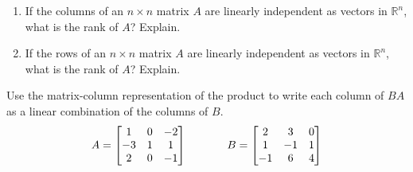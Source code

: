 \documentclass[12pt,letterpaper]{hmcpset}
\begin{document}
\begin{solution}
\vfill
\end{solution}
\newpage

\begin{problem}[2.3.42]

\begin{enumerate}
	\item
		If the columns of an $n \times n$ matrix $A$ are linearly independent as vectors in $\mathbb{R}^n$, what is the rank of $A$? Explain.
	\item
		If the rows of an $n \times n$ matrix $A$ are linearly independent as vectors in $\mathbb{R}^n$, what is the rank of $A$? Explain.
\end{enumerate}

\end{problem}

\begin{solution}
\vfill
\end{solution}
\newpage

\begin{problem}[3.1.26]

Use the matrix-column representation of the product to write each column of $BA$ as a linear combination of the columns of $B$.\\

$$A = \begin{bmatrix}
        1 & 0 & -2 \\
        -3 & 1 & 1 \\
        2 & 0 & -1
      \end{bmatrix} \hspace{0.5in} B = \begin{bmatrix}
	2 & 3 & 0 \\
	1 & -1 & 1 \\
	-1 & 6 & 4
    \end{bmatrix}$$\\

\end{problem}

\begin{solution}
\vfill
\end{solution}
\newpage
\end{document}
